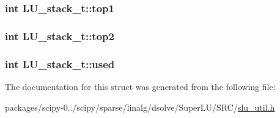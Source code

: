 \subsubsection[{top1}]{\setlength{\rightskip}{0pt plus 5cm}int L\+U\+\_\+stack\+\_\+t\+::top1}\label{structLU__stack__t_a3ba965e6621326c518c95d791afe6fef}
\hypertarget{structLU__stack__t_a1ae2a485bc81409ceb05bce271363901}{}
\subsubsection[{top2}]{\setlength{\rightskip}{0pt plus 5cm}int L\+U\+\_\+stack\+\_\+t\+::top2}\label{structLU__stack__t_a1ae2a485bc81409ceb05bce271363901}
\hypertarget{structLU__stack__t_a78ad1773677b220bd843c9d84bbda869}{}
\subsubsection[{used}]{\setlength{\rightskip}{0pt plus 5cm}int L\+U\+\_\+stack\+\_\+t\+::used}\label{structLU__stack__t_a78ad1773677b220bd843c9d84bbda869}


The documentation for this struct was generated from the following file\+:\begin{DoxyCompactItemize}
\item 
packages/scipy-\/0../scipy/sparse/linalg/dsolve/\+Super\+L\+U/\+S\+R\+C/\hyperlink{slu__util_8h}{slu\+\_\+util.\+h}\end{DoxyCompactItemize}
